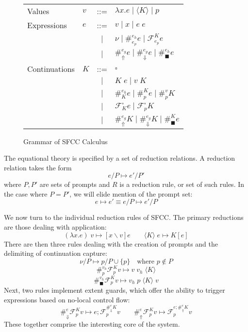 \documentclass[11pt]{article}
\newcommand\x{\lambda x}
\newcommand\F{\mathcal{F}}
\newcommand{\angles}[1]{\langle#1\rangle}
\begin{document}
\begin{figure}[H]
\caption{Grammar of SFCC Calculus}
\label{fig:SFCCgrammar}

\begin{tabular}{llcl}
Values & $v$ & ::= & $\lambda x.e \mid \angles{K} \mid p$ \\
Expressions & $e$ & ::= &
          $v \mid
           x \mid
           e\;e$ \\
& & $|$ & $\nu \mid
           \#_{e_p}^{e_h}e \mid
           \F_{e_p}^Ke$ \\
& & $|$ & $\#_\Uparrow^{e_g}e \mid
           \#_\Downarrow^{e_g}e \mid
           \#_\blacksquare^{e_h}e$ \\
Continuations & $K$ & ::= &
          $\square$ \\
& & $|$ & $K\;e \mid v\;K$ \\
& & $|$ & $\#_{K}^{e_h}e \mid
           \#_{p}^{K}e \mid
           \#_{p}^{v}K$ \\
& & $|$ & $\F_{K}^{\square}e \mid
           \F_{p}^{\square}K$ \\
& & $|$ & $\#_{\Uparrow}^{e_g}K \mid
           \#_{\Downarrow}^{e_g}K \mid
           \#_{\blacksquare}^{K}e$ \\
\end{tabular}
\end{figure}


The equational theory is specified by a set of reduction relations.
A reduction relation takes the form
$$e/P \mapsto e'/P'$$
where $P, P'$ are sets of prompts and $R$ is a reduction rule, or set of such rules.
In the case where $P = P'$, we will elide mention of the prompt set:
$$e \mapsto e' \equiv e/P \mapsto e'/P$$


We now turn to the individual reduction rules of SFCC.
The primary reductions are those dealing with application:
$$(\x.e)\;v \mapsto [x \backslash v]e \qquad
  \angles{K}\;e \mapsto K[e]$$
There are then three rules dealing with the creation of prompts and the delimiting of continuation capture:
$$\nu/P \mapsto p/P\cup\{p\} \quad\textrm{where }p \notin P$$
$$\#_p^{v_h}\F_p^Kv \mapsto v\;v_h\;\angles K$$
$$\#_\blacksquare^{v_h}\F_p^K v \mapsto v_h\;p\;\angles{K}\;v$$
Next, two rules implement extent guards, which offer the ability to trigger expressions based on no-local control flow:
$$\#_{\Downarrow}^{e}\F_p^K v \mapsto e;\F_p^{\#_\Downarrow^{e}K}v \qquad
  \#_{\Uparrow}^{e}\F_p^K v \mapsto \F_p^{e;\#_\Uparrow^{e}K}v$$
These together comprise the interesting core of the system.
\end{document}
